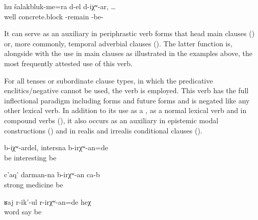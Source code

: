 \begin{exe}
	\ex	\label{ex:If the concrete blocks remained (are left over)}
	\gll	hu		šalakbluk-me=ra	d-el	d-iχʷ-ar,	\ldots\\
		well		concrete.block	-remain\tsc{.pfv}	-be-\\
	\glt	{}
\end{exe}

It can serve as an auxiliary in periphrastic verb forms that head main clauses () or, more commonly, temporal adverbial clauses (). The latter function is, alongside with the use in main clauses as illustrated in the examples above, the most frequently attested use of this verb.

For all tenses or subordinate clause types, in which the predicative enclitics\slash negative  cannot be used, the verb   is employed. This verb has the full inflectional paradigm including  forms  and future forms  and is negated like any other lexical verb. In addition to its use as a , as a normal lexical verb and in compound verbs (), it also occurs as an auxiliary in epistemic modal constructions  () and in realis  and irrealis conditional clauses ().\largerpage

\begin{exe}
	\ex	\label{ex:If it would be like this, it would be interesting}
	\gll	b-iχʷ-ardel,	intersna	b-irχʷ-an=de\\
		be	interesting	be\\
	\glt	{}

	\ex	\label{ex:It will be a strong medicine}
	\gll	c'aq'	darman-na	b-irχʷ-an	ca-b\\
		strong	medicine be	\\
	\glt	{}

	\ex	\label{ex:She must have been quarreling}
	\gll	ʁaj	r-ik'-ul	r-irχʷ-an=de 	heχ\\
		word	say 	be 	\\
	\glt	{}
\end{exe}

